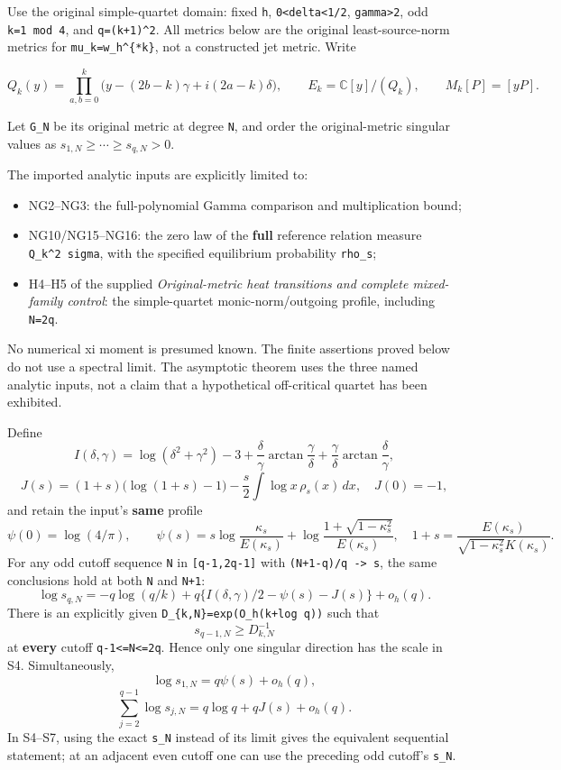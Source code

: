 \documentclass[11pt]{article}
\providecommand{\tightlist}{}
\begin{document}
Use the original simple-quartet domain: fixed \texttt{h}, \texttt{0\textless{}delta\textless{}1/2}, \texttt{gamma\textgreater{}2}, odd \texttt{k=1\ mod\ 4}, and \texttt{q=(k+1)\^{}2}. All metrics below are the original least-source-norm metrics for \texttt{mu\_k=w\_h\^{}\{*k\}}, not a constructed jet metric. Write

\[
 Q_k(y)=\prod_{a,b=0}^{k}\bigl(y-(2b-k)\gamma+i(2a-k)\delta\bigr),\qquad
 E_k=\mathbb C[y]/(Q_k),\qquad M_k[P]=[yP].
\]

Let \texttt{G\_N} be its original metric at degree \texttt{N}, and order the original-metric singular values as \(s_{1,N}\ge\cdots\ge s_{q,N}>0\).

The imported analytic inputs are explicitly limited to:

\begin{itemize}
\tightlist
\item
  NG2--NG3: the full-polynomial Gamma comparison and multiplication bound;
\item
  NG10/NG15--NG16: the zero law of the \textbf{full} reference relation measure \texttt{Q\_k\^{}2\ sigma}, with the specified equilibrium probability \texttt{rho\_s};
\item
  H4--H5 of the supplied \emph{Original-metric heat transitions and complete mixed-family control}: the simple-quartet monic-norm/outgoing profile, including \texttt{N=2q}.
\end{itemize}

No numerical xi moment is presumed known. The finite assertions proved below do not use a spectral limit. The asymptotic theorem uses the three named analytic inputs, not a claim that a hypothetical off-critical quartet has been exhibited.

Define \[
 I(\delta,\gamma)=\log(\delta^2+\gamma^2)-3
 +\frac\delta\gamma\arctan\frac\gamma\delta
 +\frac\gamma\delta\arctan\frac\delta\gamma,                         \tag{S1}
\] \[
 J(s)=(1+s)\bigl(\log(1+s)-1\bigr)
       -\frac s2\int\log x\,\rho_s(x)\,dx,\quad J(0)=-1,             \tag{S2}
\] and retain the input's \textbf{same} profile \[
 \psi(0)=\log(4/\pi),\qquad
 \psi(s)=s\log\frac{\kappa_s}{E(\kappa_s)}
          +\log\frac{1+\sqrt{1-\kappa_s^2}}{E(\kappa_s)},
 \quad 1+s=\frac{E(\kappa_s)}{\sqrt{1-\kappa_s^2}K(\kappa_s)}.       \tag{S3}
\] For any odd cutoff sequence \texttt{N} in \texttt{{[}q-1,2q-1{]}} with \texttt{(N+1-q)/q\ -\textgreater{}\ s}, the same conclusions hold at both \texttt{N} and \texttt{N+1}: \[
 \boxed{\log s_{q,N}
 =-q\log(q/k)+q\{I(\delta,\gamma)/2-\psi(s)-J(s)\}+o_h(q).}         \tag{S4}
\] There is an explicitly given \nolinkurl{D_{k,N}=exp(O_h(k+log q))} such that \[
 \boxed{s_{q-1,N}\ge D_{k,N}^{-1}}                                  \tag{S5}
\] at \textbf{every} cutoff \texttt{q-1\textless{}=N\textless{}=2q}. Hence only one singular direction has the scale in S4. Simultaneously, \[
 \log s_{1,N}=q\psi(s)+o_h(q),                                      \tag{S6}
\] \[
 \boxed{\sum_{j=2}^{q-1}\log s_{j,N}
             =q\log q+qJ(s)+o_h(q).}                               \tag{S7}
\] In S4--S7, using the exact \texttt{s\_N} instead of its limit gives the equivalent sequential statement; at an adjacent even cutoff one can use the preceding odd cutoff's \texttt{s\_N}.
\end{document}
